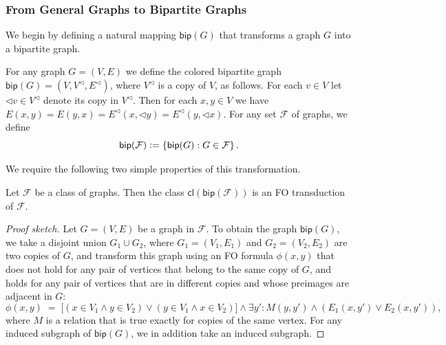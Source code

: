 \documentclass{article}
\newcommand{\define}{\vcentcolon=}
\newcommand{\cF}{\ensuremath{\mathcal{F}}}
\newcommand{\bip}{\mathsf{bip}}
\newcommand{\cl}{\mathsf{cl}}
\begin{document}
\subsubsection{From General Graphs to Bipartite Graphs}\label{sec:to-bip-graphs}

We begin by defining a natural mapping $\bip(G)$ that transforms a graph $G$ into a bipartite graph.

\newcommand{\cpy}{\triangleleft}
\begin{definition}
For any graph $G = (V,E)$ we define the colored bipartite graph $\bip(G) = (V,V^\cpy,E^\cpy)$, where
$V^\cpy$ is a copy of $V$, as follows. For each $v \in V$ let $\cpy v \in V^\cpy$ denote its copy in
$V^\cpy$.  Then for each $x,y \in V$ we have $E(x,y) = E(y,x) = E^\cpy(x, \cpy y) = E^\cpy(y, \cpy x)$. For
any set $\cF$ of graphs, we define
\[
  \bip(\cF) \define \{ \bip(G) : G \in \cF \} \,.
\]
\end{definition}

We require the following two simple properties of this transformation.
\begin{proposition}\label{prop:Bip-transduction}
	Let $\cF$ be a class of graphs. Then the class $\cl(\bip(\cF))$ is an FO transduction of $\cF$.
\end{proposition}
\begin{proof}[Proof sketch]
	Let $G=(V,E)$ be a graph in $\cF$. To obtain the graph $\bip(G)$, we take a disjoint union $G_1 \cup G_2$, where
	$G_1=(V_1,E_1)$ and $G_2 = (V_2, E_2)$ are two copies of $G$,
	and transform this graph using an FO formula $\phi(x,y)$ that does not hold for any pair of vertices 
	that belong to the same copy of $G$, and holds for any pair of vertices that are in different copies and whose
	preimages are adjacent in $G$:
	$$
		\phi(x,y) \;=\; \bigl[(x \in V_1 \wedge y \in V_2) \vee (y \in V_1 \wedge x \in V_2)\bigr] 
		\wedge \exists y' : M(y,y') \wedge (E_1(x,y') \vee E_2(x,y')),
	$$
	where $M$ is a relation that is true exactly for copies of the same vertex.
	For any induced subgraph of $\bip(G)$, we in addition take an induced subgraph.
\end{proof}
\end{document}
